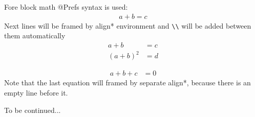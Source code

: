 \documentclass[12pt,a4paper,oneside]{article}
\begin{document}
Fore block math @Prefs syntax is used: 
\begin{align*}
a + b = c 
\end{align*}
Next lines will be framed by align* environment and \verb.\\. 
will be added between them automatically
\begin{align*}
a + b     &= c
\\(a + b)^2 &= d
\end{align*}

\begin{align*}
a + b + c &= 0
\end{align*}
Note that the last equation will framed by separate align*, because
there is an empty line before it. 

To be continued... 
\end{document}
